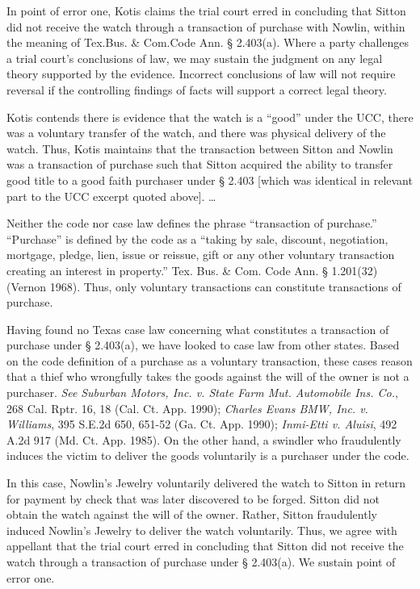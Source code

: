 In point of error one, Kotis claims the trial court erred in concluding that
Sitton did not receive the watch through a transaction of purchase with Nowlin,
within the meaning of Tex.Bus. \& Com.Code Ann. {\S} 2.403(a). Where a party
challenges a trial court's conclusions of law, we may sustain the judgment on
any legal theory supported by the evidence. Incorrect conclusions of law will
not require reversal if the controlling findings of facts will support a
correct legal theory.

Kotis contends there is evidence that the watch is a ``good'' under the UCC,
there was a voluntary transfer of the watch, and there was physical delivery of
the watch. Thus, Kotis maintains that the transaction between Sitton and Nowlin
was a transaction of purchase such that Sitton acquired the ability to transfer
good title to a good faith purchaser under {\S} 2.403 [which was identical in
relevant part to the UCC excerpt quoted above]. \ldots

Neither the code nor case law defines the phrase ``transaction of purchase.''
``Purchase'' is defined by the code as a ``taking by sale, discount,
negotiation, mortgage, pledge, lien, issue or reissue, gift or any other
voluntary transaction creating an interest in property.'' Tex. Bus. \& Com.
Code Ann. {\S} 1.201(32) (Vernon 1968). Thus, only voluntary transactions can
constitute transactions of purchase.

Having found no Texas case law concerning what constitutes a transaction of
purchase under {\S} 2.403(a), we have looked to case law from other states.
Based on the code definition of a purchase as a voluntary transaction, these
cases reason that a thief who wrongfully takes the goods against the will of
the owner is not a purchaser. \textit{See} \textit{Suburban Motors, Inc. v.
State Farm Mut. Automobile Ins. Co.}, 268 Cal. Rptr. 16, 18 (Cal. Ct. App.
1990); \textit{Charles Evans BMW, Inc. v. Williams}, 395 S.E.2d 650, 651-52 (Ga.
Ct. App. 1990); \textit{Inmi-Etti v. Aluisi}, 492 A.2d 917 (Md. Ct. App. 1985).
On the other hand, a swindler who fraudulently induces the victim to deliver
the goods voluntarily is a purchaser under the code.

In this case, Nowlin's Jewelry voluntarily delivered the watch to Sitton in
return for payment by check that was later discovered to be forged. Sitton did
not obtain the watch against the will of the owner. Rather, Sitton fraudulently
induced Nowlin's Jewelry to deliver the watch voluntarily. Thus, we agree with
appellant that the trial court erred in concluding that Sitton did not receive
the watch through a transaction of purchase under {\S} 2.403(a). We sustain
point of error one.

